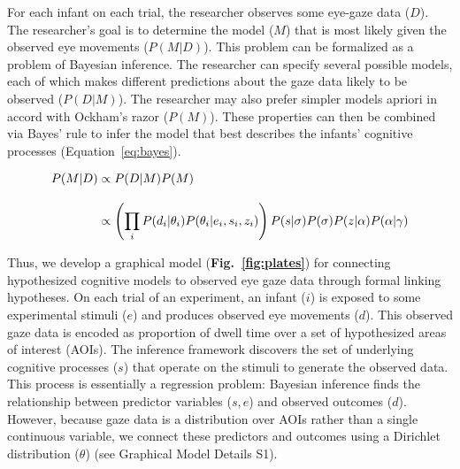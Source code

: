 \documentclass[12pt]{article}
\begin{document}
	For each infant on each trial, the researcher observes some eye-gaze data ($D$). The researcher’s goal is to determine the model ($M$) that is most likely given the observed eye movements ($P(M|D)$). This problem can be formalized as a problem of Bayesian inference. The researcher can specify several possible models, each of which makes different predictions about the gaze data likely to be observed ($P(D|M)$). The researcher may also prefer simpler models apriori in accord with Ockham’s razor ($P(M)$). These properties can then be combined via Bayes' rule to infer the model that best describes the infants’ cognitive processes (Equation~\ref{eq:bayes}).

\begin{equation}\label{eq:bayes}
\setlength{\jot}{12pt}
\begin{aligned} 
P(M|D) &\propto P(D|M)P(M)\\
&\propto \left(\prod_{i}P(d_{i}|\theta_{i})P(\theta_{i}|e_{i},s_{i},z_{i})\right)P(s|\sigma)P(\sigma)P(z|\alpha)P(\alpha|\gamma)
\end{aligned}
\end{equation}

	Thus, we develop a graphical model (\textbf{Fig.~\ref{fig:plates}}) for connecting hypothesized cognitive models to observed eye gaze data through formal linking hypotheses. On each trial of an experiment, an infant ($i$) is exposed to some experimental stimuli ($e$) and produces observed eye movements ($d$). This observed gaze data is encoded as proportion of dwell time over a set of hypothesized areas of interest (AOIs). The inference framework discovers the set of underlying cognitive processes ($s$) that operate on the stimuli to generate the observed data. This process is essentially a regression problem: Bayesian inference finds the relationship between predictor variables ($s,e$) and observed outcomes ($d$). However, because gaze data is a distribution over AOIs rather than a single continuous variable, we connect these predictors and outcomes using a Dirichlet distribution ($\theta$) (see Graphical Model Details S1).
\end{document}

